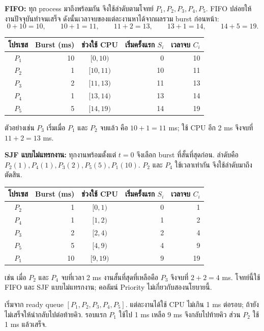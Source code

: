 \newpage{}
\noindent\textbf{FIFO:} ทุก process มาถึงพร้อมกัน จึงใช้ลำดับตามโจทย์ $P_1,P_2,P_3,P_4,P_5$. FIFO ปล่อยให้งานปัจจุบันทำจนเสร็จ ดังนั้นเวลาจบของแต่ละงานหาได้จากผลรวม burst ก่อนหน้า:
\[0+10=10,\qquad 10+1=11,\qquad 11+2=13,\qquad 13+1=14,\qquad 14+5=19.\]
\begin{center}\renewcommand{\arraystretch}{1.2}\begin{tabular}{c|r|c|r|r}
โปรเซส & Burst (ms) & ช่วงใช้ CPU & เริ่มครั้งแรก $S_i$ & เวลาจบ $C_i$\\\hline
$P_1$ & 10 & $[0,10)$ & 0 & 10\\
$P_2$ & 1 & $[10,11)$ & 10 & 11\\
$P_3$ & 2 & $[11,13)$ & 11 & 13\\
$P_4$ & 1 & $[13,14)$ & 13 & 14\\
$P_5$ & 5 & $[14,19)$ & 14 & 19\\
\end{tabular}\end{center}
\noindent ตัวอย่างเช่น $P_3$ เริ่มเมื่อ $P_1$ และ $P_2$ จบแล้ว คือ $10+1=11$ ms; ใช้ CPU อีก 2 ms จึงจบที่ $11+2=13$ ms.\par\medskip
\noindent\textbf{SJF แบบไม่แทรกงาน:} ทุกงานพร้อมตั้งแต่ $t=0$ จึงเลือก burst ที่สั้นที่สุดก่อน. ลำดับคือ $P_2(1),P_4(1),P_3(2),P_5(5),P_1(10)$. $P_2$ และ $P_4$ ใช้เวลาเท่ากัน จึงใช้ลำดับมาถึงตัดสิน.\par
\begin{center}\renewcommand{\arraystretch}{1.2}\begin{tabular}{c|r|c|r|r}
โปรเซส & Burst (ms) & ช่วงใช้ CPU & เริ่มครั้งแรก $S_i$ & เวลาจบ $C_i$\\\hline
$P_2$ & 1 & $[0,1)$ & 0 & 1\\
$P_4$ & 1 & $[1,2)$ & 1 & 2\\
$P_3$ & 2 & $[2,4)$ & 2 & 4\\
$P_5$ & 5 & $[4,9)$ & 4 & 9\\
$P_1$ & 10 & $[9,19)$ & 9 & 19\\
\end{tabular}\end{center}
\noindent เช่น เมื่อ $P_2$ และ $P_4$ จบที่เวลา 2 ms งานสั้นที่สุดที่เหลือคือ $P_3$ จึงจบที่ $2+2=4$ ms. โจทย์นี้ใช้ FIFO และ SJF แบบไม่แทรกงาน; คอลัมน์ Priority ไม่เกี่ยวกับสองนโยบายนี้.\par
\newpage{}
\noindent เริ่มจาก ready queue $[P_1,P_2,P_3,P_4,P_5]$. แต่ละงานได้ใช้ CPU ไม่เกิน 1 ms ต่อรอบ; ถ้ายังไม่เสร็จให้นำกลับไปต่อท้ายคิว. รอบแรก $P_1$ ใช้ไป 1 ms เหลือ 9 ms จึงกลับไปท้ายคิว ส่วน $P_2$ ใช้ 1 ms แล้วเสร็จ.\par\smallskip
